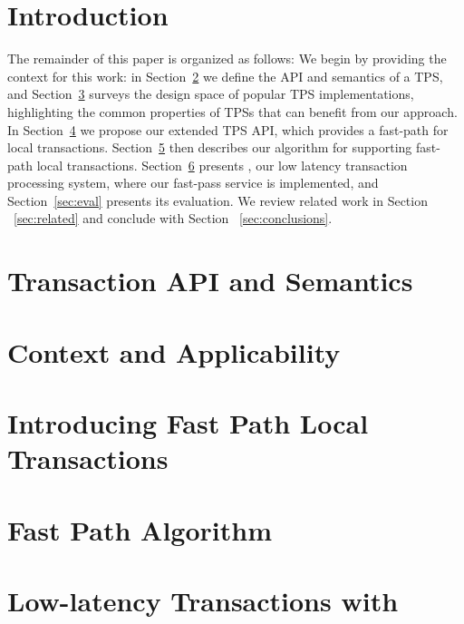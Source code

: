 \documentclass[preprint]{sigplanconf-eurosys}
\begin{document}

\section{Introduction} \label{sec:intro}


The remainder of this paper is organized as follows:
We begin by providing the context for this work:   in Section~\ref{sec:api} we define the  API and semantics of a TPS, 
and    Section~\ref{sec:context} surveys  the design space of popular TPS implementations, 
highlighting the common properties of TPSs that can benefit from our approach. 
In Section~\ref{sec:new-api} we propose our extended TPS API, which provides a fast-path for local transactions. 
Section~\ref{sec:alg} then describes our algorithm for supporting fast-path local transactions.  
Section~\ref{sec:impl} presents \sys, our low latency transaction processing system, where our fast-pass service is implemented, 
and Section~\ref{sec:eval} presents its evaluation. 
We review related work in Section ~\ref{sec:related} and conclude with Section ~\ref{sec:conclusions}.

\section{Transaction API and Semantics} \label{sec:api}


\section{Context and Applicability} \label{sec:context}


\section{Introducing Fast Path Local Transactions} \label{sec:new-api}


\section{Fast Path  Algorithm} \label{sec:alg}


\section{Low-latency Transactions with \sys} \label{sec:impl}
\end{document}
